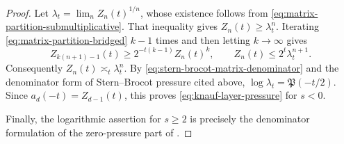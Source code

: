 \begin{proof}
Let \(\lambda_t=\lim_n Z_n(t)^{1/n}\), whose existence follows from
\eqref{eq:matrix-partition-submultiplicative}.  That inequality gives
\(Z_n(t)\ge\lambda_t^n\).  Iterating
\eqref{eq:matrix-partition-bridged} \(k-1\) times and then letting
\(k\to\infty\) gives
\[
 Z_{k(n+1)-1}(t)\ge2^{-t(k-1)}Z_n(t)^k,
 \qquad
 Z_n(t)\le2^t\lambda_t^{n+1}.
\]
Consequently \(Z_n(t)\asymp_t\lambda_t^n\).  By
\eqref{eq:stern-brocot-matrix-denominator} and the denominator form of
Stern--Brocot pressure cited above,
\(\log\lambda_t=\mathfrak P(-t/2)\).  Since
\(a_d(-t)=Z_{d-1}(t)\), this proves
\eqref{eq:knauf-layer-pressure} for \(s<0\).

Finally, the logarithmic assertion for \(s\ge2\) is precisely the
denominator formulation of the zero-pressure part of
\cite[Thm.~1.1]{KessebohmerStratmann2007}.
\end{proof}

